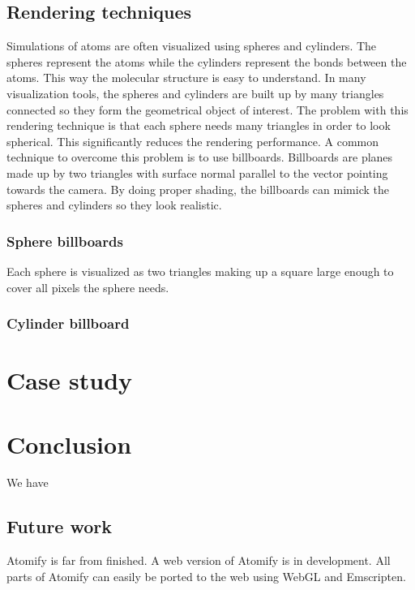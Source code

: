 \documentclass[aps,pre,twocolumn,letterpaper,floatfix]{revtex4}
\begin{document}
\subsection{Rendering techniques}
Simulations of atoms are often visualized using spheres and cylinders. The spheres represent the atoms while the cylinders represent the bonds between the atoms. This way the molecular structure is easy to understand. In many visualization tools, the spheres and cylinders are built up by many triangles connected so they form the geometrical object of interest. The problem with this rendering technique is that each sphere needs many triangles in order to look spherical. This significantly reduces the rendering performance. A common technique to overcome this problem is to use billboards. Billboards are planes made up by two triangles with surface normal parallel to the vector pointing towards the camera. By doing proper shading, the billboards can mimick the spheres and cylinders so they look realistic.

\subsubsection*{Sphere billboards}
Each sphere is visualized as two triangles making up a square large enough to cover all pixels the sphere needs. 

\subsubsection*{Cylinder billboard}

\section{Case study}


\section{Conclusion}
We have

\subsection{Future work}
Atomify is far from finished. 
A web version of Atomify is in development. 
All parts of Atomify can easily be ported to the web using WebGL and Emscripten. 



\end{document}
